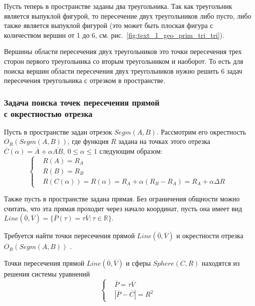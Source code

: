 Пусть теперь в пространстве заданы два треугольника.
Так как треугольник является выпуклой фигурой, то пересечение двух треугольников либо пусто, либо также является выпуклой фигурой (это может быть плоская фигура с количеством вершин от 1 до 6, см. рис.~\ref{fig:text_1_geo_prim_tri_tri}).

Вершины области пересечения двух треугольников это точки пересечения трех сторон первого треугольника со вторым треугольником и наоборот.
То есть для поиска вершин области пересечения двух треугольников нужно решить 6 задач пересечения треугольника с отрезком в пространстве.

\subsubsection{Задача поиска точек пересечения прямой \\ с окрестностью отрезка}\label{sec:text_1_geo_prim_line_eps_intersect}

Пусть в пространстве задан отрезок $Segm(A, B)$.
Рассмотрим его окрестность $O_R(Segm(A, B))$, где функция $R$ задана на точках этого отрезка $\overline{C}(\alpha) = \overline{A} + \alpha \overline{AB}, \ 0 \le \alpha \le 1$ следующим образом:
\begin{equation}
	\left\{
		\begin{aligned}
			& R(A) = R_A \\
			& R(B) = R_B \\
			& R(C(\alpha)) = R(\alpha) = R_A + \alpha (R_B - R_A) = R_A + \alpha \Delta R
		\end{aligned}
	\right.
\end{equation}

Также пусть в пространстве задана прямая.
Без ограничения общности можно считать, что эта прямая проходит через начало координат, пусть она имеет вид $Line(\overline{0}, \overline{V}) = \{ \overline{P}(\tau) = \tau \overline{V}: \tau \in \mathbb{R} \}$.

Требуется найти точки пересечения прямой $Line(\overline{0}, \overline{V})$ и окрестности отрезка $O_R(Segm(A, B))$ \cite{Rybakov2017Flight}.

Точки пересечения прямой $Line(\overline{0}, \overline{V})$ и сферы $Sphere(C, R)$ находятся из решения системы уравнений
\begin{equation}\label{eqn:text_1_geo_prim_tv_pcr}
	\left\{
		\begin{aligned}
			& \overline{P} = \tau \overline{V} \\
			& |\overline{P} - \overline{C}| = R^2
		\end{aligned}
	\right.
\end{equation}

